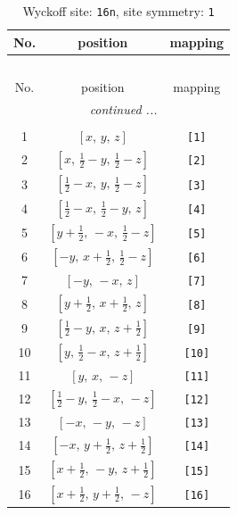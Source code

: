 \documentclass[fleqn,8pt]{jsarticle}
\begin{document}
\begin{longtable}{ccc}
\caption{Wyckoff site: {\tt 16n}, site symmetry: {\tt 1}}
 \\
 \hline \hline
No. & position & mapping \\ \hline \endfirsthead

\multicolumn{2}{l}{\tablename\ \thetable{}} \\
 \hline \hline
No. & position & mapping \\ \hline \endhead

 \hline \hline
\multicolumn{2}{r}{\footnotesize\it continued ...} \\ \endfoot

 \hline \hline
\multicolumn{2}{r}{} \\ \endlastfoot

1 & $\left[ x,\, y,\, z \right]$ & {\tt [1]} \\ \hline
2 & $\left[ x,\, \frac{1}{2} - y,\, \frac{1}{2} - z \right]$ & {\tt [2]} \\ \hline
3 & $\left[ \frac{1}{2} - x,\, y,\, \frac{1}{2} - z \right]$ & {\tt [3]} \\ \hline
4 & $\left[ \frac{1}{2} - x,\, \frac{1}{2} - y,\, z \right]$ & {\tt [4]} \\ \hline
5 & $\left[ y + \frac{1}{2},\, - x,\, \frac{1}{2} - z \right]$ & {\tt [5]} \\ \hline
6 & $\left[ - y,\, x + \frac{1}{2},\, \frac{1}{2} - z \right]$ & {\tt [6]} \\ \hline
7 & $\left[ - y,\, - x,\, z \right]$ & {\tt [7]} \\ \hline
8 & $\left[ y + \frac{1}{2},\, x + \frac{1}{2},\, z \right]$ & {\tt [8]} \\ \hline
9 & $\left[ \frac{1}{2} - y,\, x,\, z + \frac{1}{2} \right]$ & {\tt [9]} \\ \hline
10 & $\left[ y,\, \frac{1}{2} - x,\, z + \frac{1}{2} \right]$ & {\tt [10]} \\ \hline
11 & $\left[ y,\, x,\, - z \right]$ & {\tt [11]} \\ \hline
12 & $\left[ \frac{1}{2} - y,\, \frac{1}{2} - x,\, - z \right]$ & {\tt [12]} \\ \hline
13 & $\left[ - x,\, - y,\, - z \right]$ & {\tt [13]} \\ \hline
14 & $\left[ - x,\, y + \frac{1}{2},\, z + \frac{1}{2} \right]$ & {\tt [14]} \\ \hline
15 & $\left[ x + \frac{1}{2},\, - y,\, z + \frac{1}{2} \right]$ & {\tt [15]} \\ \hline
16 & $\left[ x + \frac{1}{2},\, y + \frac{1}{2},\, - z \right]$ & {\tt [16]} \\
\end{longtable}
\end{document}
